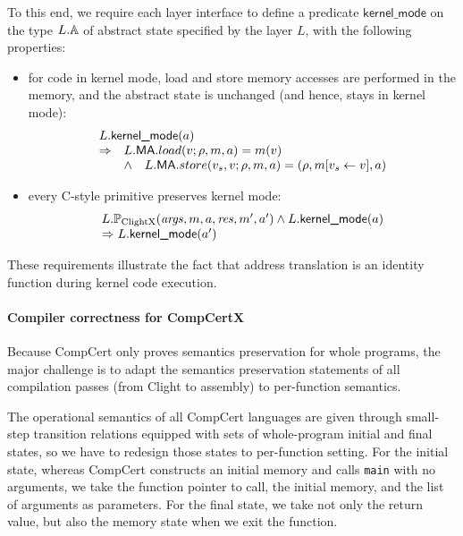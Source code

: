 To this end, we require each layer interface to define a predicate
$\textsf{kernel\_mode}$ on the type $L.\mathbb{A}$ of abstract state specified by
the layer  $L$, with the following properties:

\begin{itemize}
\item for code in kernel mode, load and store memory accesses are
  performed in the memory, and the abstract state is unchanged
  (and hence, stays in kernel mode):
\[
\begin{array}{ll}
 \multicolumn{2}{l}{
L.\textsf{kernel\_mode}(a)} \\
\Rightarrow & L.\mat.load(v; \rho, m, a)  = m(v) \\
& \land  \quad L.\mat.store(v_s, v; \rho, m, a) = (\rho, m[v_s \leftarrow v], a)
\end{array}
\]

\item every C-style primitive preserves kernel mode:
\[
\begin{array}{l}
 L.\mathbb{P}_{\mathrm{ClightX}}(\mathit{args}, m, a, \mathit{res}, m', a')
\land {L.\textsf{kernel\_mode}(a)} \\
\Rightarrow  {L.\textsf{kernel\_mode}(a')}
\end{array}
\]
\end{itemize}%
These requirements illustrate the fact that address translation is an
identity function during kernel code execution.


\paragraph{Compiler correctness for CompCertX} 

Because CompCert only proves semantics preservation for whole
programs, the major challenge is to adapt the semantics preservation
statements of all compilation passes (from Clight to assembly) 
to per-function semantics.

The operational semantics of all CompCert languages are given through
small-step transition relations equipped with sets of whole-program
initial and final states, so we have to redesign those states to
per-function setting. For the initial state, whereas CompCert
constructs an initial memory and calls \verb+main+ with no arguments,
we take the function pointer to call, the initial memory, and the list
of arguments as parameters. For the final state, we take not
only the return value, but also the memory state when we exit the
function.

